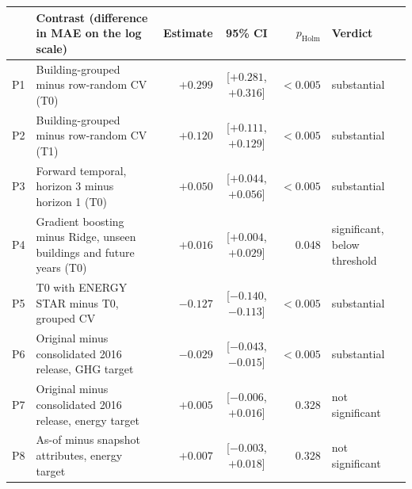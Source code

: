 \begin{tabular}{llrcrl}
\toprule
 & Contrast (difference in MAE on the log scale) & Estimate & 95\% CI & $p_{\mathrm{Holm}}$ & Verdict \\
\midrule
P1 & Building-grouped minus row-random CV (T0) & $+0.299$ & [$+0.281$, $+0.316$] & $<0.005$ & substantial \\
P2 & Building-grouped minus row-random CV (T1) & $+0.120$ & [$+0.111$, $+0.129$] & $<0.005$ & substantial \\
P3 & Forward temporal, horizon 3 minus horizon 1 (T0) & $+0.050$ & [$+0.044$, $+0.056$] & $<0.005$ & substantial \\
P4 & Gradient boosting minus Ridge, unseen buildings and future years (T0) & $+0.016$ & [$+0.004$, $+0.029$] & 0.048 & significant, below threshold \\
P5 & T0 with ENERGY STAR minus T0, grouped CV & $-0.127$ & [$-0.140$, $-0.113$] & $<0.005$ & substantial \\
P6 & Original minus consolidated 2016 release, GHG target & $-0.029$ & [$-0.043$, $-0.015$] & $<0.005$ & substantial \\
P7 & Original minus consolidated 2016 release, energy target & $+0.005$ & [$-0.006$, $+0.016$] & 0.328 & not significant \\
P8 & As-of minus snapshot attributes, energy target & $+0.007$ & [$-0.003$, $+0.018$] & 0.328 & not significant \\
\bottomrule
\end{tabular}
